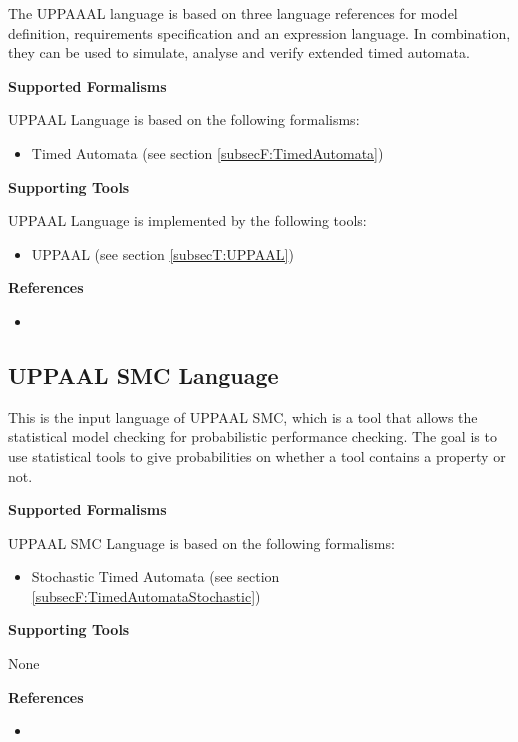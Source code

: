 The UPPAAAL language is based on three language references for model definition, requirements specification and an expression language. In combination, they can be used to simulate, analyse and verify extended timed automata.

\textbf{Supported Formalisms}

UPPAAL Language is based on the following formalisms:
\begin{itemize}
	\item Timed Automata (see section \ref{subsecF:TimedAutomata})
\end{itemize}


\textbf{Supporting Tools}

UPPAAL Language is implemented by the following tools:
\begin{itemize}
	\item UPPAAL (see section \ref{subsecT:UPPAAL})
\end{itemize}


\textbf{References}
\begin{itemize}
	
\item {}
\end{itemize}



\subsection{UPPAAL SMC Language}
\label{subsecL:UPPAALSMCSpecificationLanguage}


This is the input language of UPPAAL SMC, which is a tool that allows the statistical model checking for probabilistic performance checking. The goal is to use statistical tools to give probabilities on whether a tool contains a property or not.

\textbf{Supported Formalisms}

UPPAAL SMC Language is based on the following formalisms:
\begin{itemize}
	\item Stochastic Timed Automata (see section \ref{subsecF:TimedAutomataStochastic})
\end{itemize}


\textbf{Supporting Tools}

None


\textbf{References}
\begin{itemize}
	
\item {}
\end{itemize}



